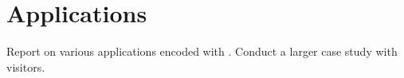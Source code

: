 \section{Applications}

Report on various applications encoded with \name. Conduct a larger case study with visitors.

